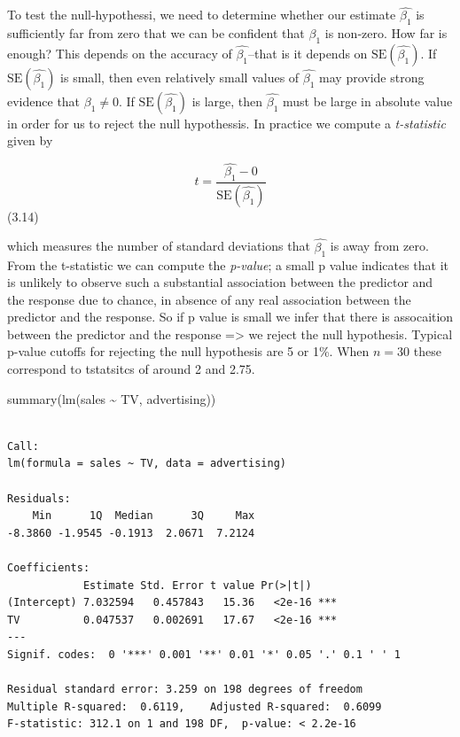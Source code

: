\documentclass[
  letterpaper,
  DIV=11,
  numbers=noendperiod]{scrreprt}
\newenvironment{Shaded}{\begin{snugshade}}{\end{snugshade}}
\newcommand{\FunctionTok}[1]{\textcolor[rgb]{0.02,0.16,0.49}{#1}}
\newcommand{\NormalTok}[1]{\textcolor[rgb]{0.33,0.33,0.33}{#1}}
\newcommand{\SpecialCharTok}[1]{\textcolor[rgb]{0.00,0.46,0.62}{#1}}
\begin{document}
To test the null-hypothessi, we need to determine whether our estimate
\(\hat{\beta_1}\) is sufficiently far from zero that we can be confident
that \(\beta_1\) is non-zero. How far is enough? This depends on the
accuracy of \(\hat{\beta_1}\)--that is it depends on
\(\text{SE}(\hat{\beta_1})\). If \(\text{SE}(\hat{\beta_1})\) is small,
then even relatively small values of \(\hat{\beta_1}\) may provide
strong evidence that \(\beta_1 \neq 0\). If \(\text{SE}(\hat{\beta_1})\)
is large, then \(\hat{\beta_1}\) must be large in absolute value in
order for us to reject the null hypothessis. In practice we compute a
\emph{t-statistic} given by

\[
t = \frac{\hat{\beta_1} - 0}{\text{SE}(\hat{\beta_1})}
\] (3.14)

which measures the number of standard deviations that \(\hat{\beta_1}\)
is away from zero. From the t-statistic we can compute the
\emph{p-value}; a small p value indicates that it is unlikely to observe
such a substantial association between the predictor and the response
due to chance, in absence of any real association between the predictor
and the response. So if p value is small we infer that there is
assocaition between the predictor and the response =\textgreater{} we
reject the null hypothesis. Typical p-value cutoffs for rejecting the
null hypothesis are 5 or 1\%. When \(n=30\) these correspond to
tstatsitcs of around 2 and 2.75.

\begin{Shaded}
\begin{Highlighting}[]
\FunctionTok{summary}\NormalTok{(}\FunctionTok{lm}\NormalTok{(sales }\SpecialCharTok{\textasciitilde{}}\NormalTok{ TV, advertising))}
\end{Highlighting}
\end{Shaded}

\begin{verbatim}

Call:
lm(formula = sales ~ TV, data = advertising)

Residuals:
    Min      1Q  Median      3Q     Max 
-8.3860 -1.9545 -0.1913  2.0671  7.2124 

Coefficients:
            Estimate Std. Error t value Pr(>|t|)    
(Intercept) 7.032594   0.457843   15.36   <2e-16 ***
TV          0.047537   0.002691   17.67   <2e-16 ***
---
Signif. codes:  0 '***' 0.001 '**' 0.01 '*' 0.05 '.' 0.1 ' ' 1

Residual standard error: 3.259 on 198 degrees of freedom
Multiple R-squared:  0.6119,    Adjusted R-squared:  0.6099 
F-statistic: 312.1 on 1 and 198 DF,  p-value: < 2.2e-16
\end{verbatim}
\end{document}
